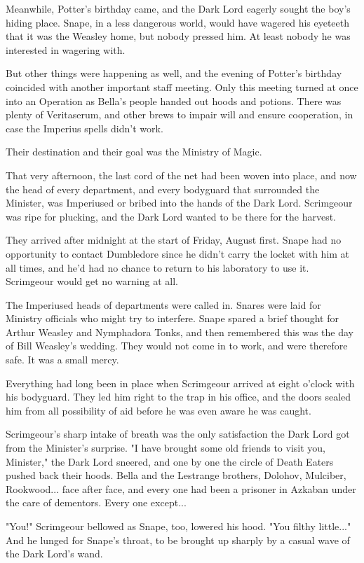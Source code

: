 Meanwhile, Potter's birthday came, and the Dark Lord eagerly sought the boy's hiding place. Snape, in a less dangerous world, would have wagered his eyeteeth that it was the Weasley home, but nobody pressed him. At least nobody he was interested in wagering with.

But other things were happening as well, and the evening of Potter's birthday coincided with another important staff meeting. Only this meeting turned at once into an Operation as Bella's people handed out hoods and potions. There was plenty of Veritaserum, and other brews to impair will and ensure cooperation, in case the Imperius spells didn't work.

Their destination and their goal was the Ministry of Magic.

That very afternoon, the last cord of the net had been woven into place, and now the head of every department, and every bodyguard that surrounded the Minister, was Imperiused or bribed into the hands of the Dark Lord. Scrimgeour was ripe for plucking, and the Dark Lord wanted to be there for the harvest.

They arrived after midnight at the start of Friday, August first. Snape had no opportunity to contact Dumbledore since he didn't carry the locket with him at all times, and he'd had no chance to return to his laboratory to use it. Scrimgeour would get no warning at all.

The Imperiused heads of departments were called in. Snares were laid for Ministry officials who might try to interfere. Snape spared a brief thought for Arthur Weasley and Nymphadora Tonks, and then remembered this was the day of Bill Weasley's wedding. They would not come in to work, and were therefore safe. It was a small mercy.

Everything had long been in place when Scrimgeour arrived at eight o'clock with his bodyguard. They led him right to the trap in his office, and the doors sealed him from all possibility of aid before he was even aware he was caught.

Scrimgeour's sharp intake of breath was the only satisfaction the Dark Lord got from the Minister's surprise. "I have brought some old friends to visit you, Minister," the Dark Lord sneered, and one by one the circle of Death Eaters pushed back their hoods. Bella and the Lestrange brothers, Dolohov, Mulciber, Rookwood... face after face, and every one had been a prisoner in Azkaban under the care of dementors. Every one except...

"You!" Scrimgeour bellowed as Snape, too, lowered his hood. "You filthy little..." And he lunged for Snape's throat, to be brought up sharply by a casual wave of the Dark Lord's wand.

